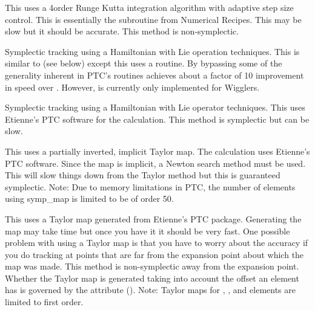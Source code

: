 \begin{description}
\item[\vn{runge_kutta!tracking method}]
This uses a 4\Th order Runge Kutta integration algorithm with adaptive
step size control.  This is essentially the  subroutine
from Numerical Recipes\cite{b:nr}. This may be slow but it should be
accurate. This method is non-symplectic.

\item[\vn{Symp_Lie_Bmad!tracking method}]
Symplectic tracking using a Hamiltonian with Lie operation techniques.
This is similar to  (see below) except this uses a
\bmad routine. By bypassing some of the generality inherent in PTC's routines
 achieves about a factor of 10 improvement in speed over
. However,  is
currently only implemented for Wigglers.

\item[\vn{Symp_Lie_PTC}]
Symplectic tracking using a Hamiltonian with Lie operator techniques.
This uses Etienne's PTC software for the calculation. This method is
symplectic but can be slow.

\item[\vn{Symp_Map}]
This uses a partially inverted, implicit Taylor map. The calculation
uses Etienne's PTC software.  Since the map is implicit, a Newton
search method must be used. This will slow things down from the Taylor
method but this is guaranteed symplectic. Note: Due to memory limitations
in PTC, the number of elements using symp_map is limited to be of order 50.

\item[\vn{Taylor}]
This uses a Taylor map generated from Etienne's PTC
package. Generating the map may take time but once you have it it
should be very fast. One possible problem with using a Taylor map is
that you have to worry about the accuracy if you do tracking at points
that are far from the expansion point about which the map was
made. This method is non-symplectic away from the expansion
point. Whether the Taylor map is generated taking into account the
offset an element has is governed by the 
attribute (). Note: Taylor maps for , ,
and  elements are limited to first order.

\end{description}


